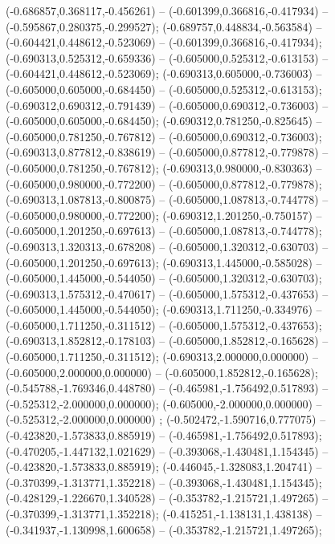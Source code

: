  (-0.686857,0.368117,-0.456261) -- (-0.601399,0.366816,-0.417934) -- (-0.595867,0.280375,-0.299527);
 (-0.689757,0.448834,-0.563584) -- (-0.604421,0.448612,-0.523069) -- (-0.601399,0.366816,-0.417934);
 (-0.690313,0.525312,-0.659336) -- (-0.605000,0.525312,-0.613153) -- (-0.604421,0.448612,-0.523069);
 (-0.690313,0.605000,-0.736003) -- (-0.605000,0.605000,-0.684450) -- (-0.605000,0.525312,-0.613153);
 (-0.690312,0.690312,-0.791439) -- (-0.605000,0.690312,-0.736003) -- (-0.605000,0.605000,-0.684450);
 (-0.690312,0.781250,-0.825645) -- (-0.605000,0.781250,-0.767812) -- (-0.605000,0.690312,-0.736003);
 (-0.690313,0.877812,-0.838619) -- (-0.605000,0.877812,-0.779878) -- (-0.605000,0.781250,-0.767812);
 (-0.690313,0.980000,-0.830363) -- (-0.605000,0.980000,-0.772200) -- (-0.605000,0.877812,-0.779878);
 (-0.690313,1.087813,-0.800875) -- (-0.605000,1.087813,-0.744778) -- (-0.605000,0.980000,-0.772200);
 (-0.690312,1.201250,-0.750157) -- (-0.605000,1.201250,-0.697613) -- (-0.605000,1.087813,-0.744778);
 (-0.690313,1.320313,-0.678208) -- (-0.605000,1.320312,-0.630703) -- (-0.605000,1.201250,-0.697613);
 (-0.690313,1.445000,-0.585028) -- (-0.605000,1.445000,-0.544050) -- (-0.605000,1.320312,-0.630703);
 (-0.690313,1.575312,-0.470617) -- (-0.605000,1.575312,-0.437653) -- (-0.605000,1.445000,-0.544050);
 (-0.690313,1.711250,-0.334976) -- (-0.605000,1.711250,-0.311512) -- (-0.605000,1.575312,-0.437653);
 (-0.690313,1.852812,-0.178103) -- (-0.605000,1.852812,-0.165628) -- (-0.605000,1.711250,-0.311512);
 (-0.690313,2.000000,0.000000) -- (-0.605000,2.000000,0.000000) -- (-0.605000,1.852812,-0.165628);
 (-0.545788,-1.769346,0.448780) -- (-0.465981,-1.756492,0.517893) -- (-0.525312,-2.000000,0.000000);
 (-0.605000,-2.000000,0.000000) -- (-0.525312,-2.000000,0.000000) ;
 (-0.502472,-1.590716,0.777075) -- (-0.423820,-1.573833,0.885919) -- (-0.465981,-1.756492,0.517893);
 (-0.470205,-1.447132,1.021629) -- (-0.393068,-1.430481,1.154345) -- (-0.423820,-1.573833,0.885919);
 (-0.446045,-1.328083,1.204741) -- (-0.370399,-1.313771,1.352218) -- (-0.393068,-1.430481,1.154345);
 (-0.428129,-1.226670,1.340528) -- (-0.353782,-1.215721,1.497265) -- (-0.370399,-1.313771,1.352218);
 (-0.415251,-1.138131,1.438138) -- (-0.341937,-1.130998,1.600658) -- (-0.353782,-1.215721,1.497265);
